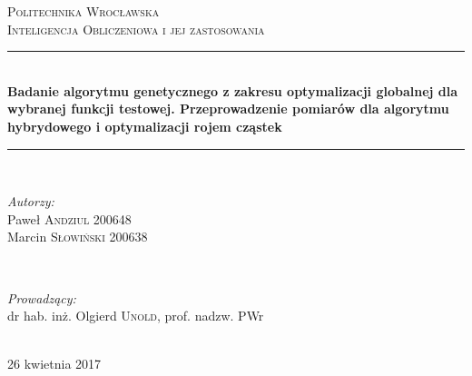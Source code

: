 \begin{titlepage}

\newcommand{\HRule}{\rule{\linewidth}{0.5mm}} 
\center 

\textsc{\LARGE Politechnika Wrocławska}\\[1.5cm] 
\textsc{\Large Inteligencja Obliczeniowa i jej zastosowania}\\[0.5cm] 
\HRule \\[0.5cm]
{ \huge \bfseries Badanie algorytmu genetycznego z zakresu optymalizacji globalnej dla wybranej funkcji testowej. Przeprowadzenie pomiarów dla algorytmu hybrydowego i optymalizacji rojem cząstek }\\[0.5cm] 
\HRule \\[1.6cm]
 
\begin{minipage}{0.4\textwidth}
\begin{flushleft} \large
\emph{Autorzy:}\\
Paweł  \textsc{Andziul} 200648 \\
Marcin  \textsc{Słowiński} 200638 \\
\end{flushleft}
\end{minipage}
~
\begin{minipage}{0.4\textwidth}
\begin{flushright} \large
\emph{Prowadzący:} \\
dr hab. inż. Olgierd \textsc{Unold}, prof. nadzw. PWr
\end{flushright}
\end{minipage}\\[4cm]

\vfill 
{\large 26 kwietnia 2017}\\[3cm] 

\end{titlepage}